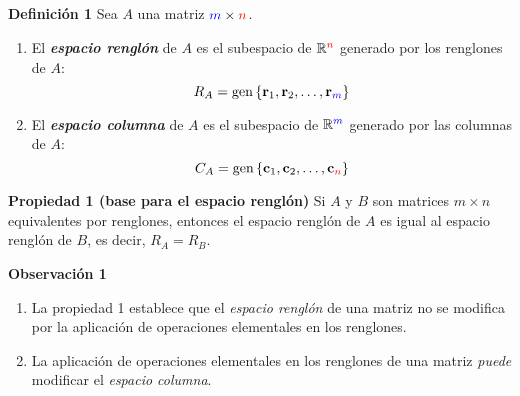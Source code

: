 
\subsection{}

{\nologo
\begin{frame}%

\begin{defi}{\textbf{Definición 1}}
	Sea $A$ una matriz ${\color{blue}m}\times {\color{red}n}$.
	\begin{enumerate}
		\item[\labelname{$a$}] El \textbf{\textit{espacio renglón}} de $A$ es el subespacio de $\mathbb{R}^{\color{red}n}$ generado por los renglones de $A$:
		\[
		R_A = \text{gen}\, \{ \mathbf{r}_1, \mathbf{r}_2, \hdots,\mathbf{r}_{\color{blue}m} \}
		\]
		\item[\labelname{$b$}] El \textbf{\textit{espacio columna}} de $A$ es el subespacio de $\mathbb{R}^{\color{blue}m}$ generado por las columnas de $A$:
		\[
		C_A = \text{gen}\, \{ \mathbf{c}_1, \mathbf{c}_2, \hdots,\mathbf{c}_{\color{red}n} \}
		\]
	\end{enumerate}
\end{defi}	

\vspace{-1mm}

\begin{prop}{\textbf{Propiedad 1 (base para el espacio renglón)}}
	\justifying
	Si $A$ y $B$ son matrices $m\times n$ equivalentes por renglones, entonces el espacio
	renglón de $A$ es igual al espacio renglón de $B$, es decir, $R_A = R_B$.
\end{prop}	

\vspace{-1mm}

\begin{alertblock}{\textbf{Observación 1}}
	\begin{enumerate}
		\item[\labelname{$a$}] La propiedad 1 establece que el \textit{espacio renglón} de una matriz
		no se modifica por la aplicación de operaciones elementales en los renglones.	
		\item[\labelname{$b$}] La aplicación de operaciones elementales en los renglones de una matriz
		\textit{puede} modificar el \textit{espacio columna}.	
	\end{enumerate}
\end{alertblock}
	
\end{frame}
}

